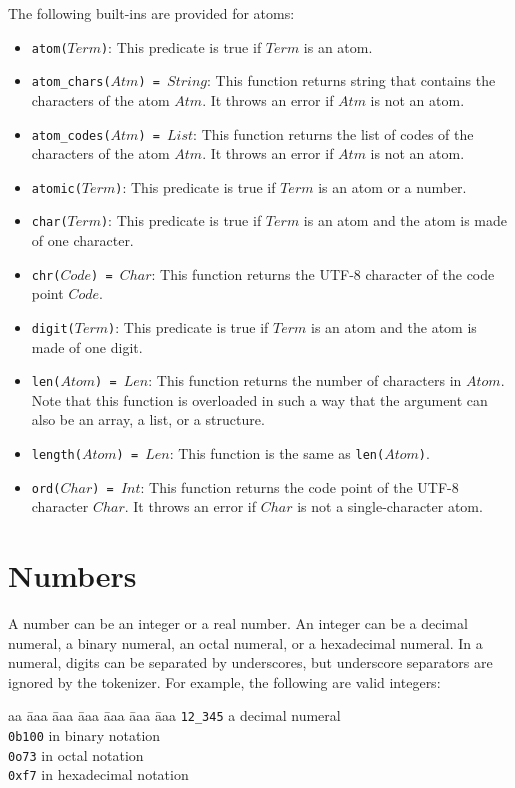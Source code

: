 The following built-ins are provided for atoms:
\begin{itemize}
\item \texttt{atom($Term$)}: This predicate is true if $Term$ is an atom.
\item \texttt{atom\_chars($Atm$) = $String$}: This function returns string that contains the characters of the atom $Atm$. It throws an error if $Atm$ is not an atom.
\item \texttt{atom\_codes($Atm$) = $List$}: This function returns the list of codes of the characters of the atom $Atm$. It throws an error if $Atm$ is not an atom. 
\item \texttt{atomic($Term$)}: This predicate is true if $Term$ is an atom or a number.
\item \texttt{char($Term$)}: This predicate is true if $Term$ is an atom and the atom is made of one character.
\item \texttt{chr($Code$) = $Char$}: This function returns the UTF-8 character of the code point $Code$.  
\item \texttt{digit($Term$)}: This predicate is true if $Term$ is an atom and the atom is made of one digit.
\item \texttt{len($Atom$) = $Len$}: This function returns the number of characters in $Atom$. Note that this function is overloaded in such a way that the argument can also be an array, a list, or a structure.
\item \texttt{length($Atom$) = $Len$}: This function is the same as \texttt{len($Atom$)}.
\item \texttt{ord($Char$) = $Int$}: This function returns the code point of the UTF-8 character $Char$.  It throws an error if $Char$ is not a single-character atom.
\end{itemize}

\section{Numbers}
A number can be an integer or a real number. An integer can be a decimal numeral, a binary numeral, an octal numeral, or a hexadecimal numeral. In a numeral, digits can be separated by underscores, but underscore separators are ignored by the tokenizer. For example, the following are valid integers:
\begin{tabbing}
aa \= aaa \= aaa \= aaa \= aaa \= aaa \= aaa \kill
\> \texttt{12\_345} \> \> \> a decimal numeral \\
\> \texttt{0b100} \> \>  in binary notation  \\
\> \texttt{0o73} \> \>  in octal notation \\
\> \texttt{0xf7} \> \>  in hexadecimal notation  
\end{tabbing}


